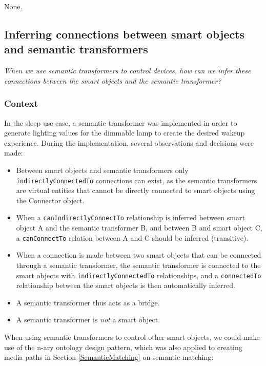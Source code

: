 None.



\subsection{Inferring connections between smart objects and semantic transformers }

\emph{When we use semantic transformers to control devices, how can we infer these connections between the smart objects and the semantic transformer?}
\subsubsection{Context}

In the sleep use-case, a semantic transformer was implemented in order to generate lighting values for the dimmable lamp to create the desired wakeup experience. During the implementation, several observations and decisions were made:

\begin{itemize}
\item 	Between smart objects and semantic transformers only \texttt{indirectly\-ConnectedTo} connections can exist, as the semantic transformers are virtual entities that cannot be directly connected to smart objects using the Connector object.
\item 	When a \texttt{canIndirectlyConnectTo} relationship is inferred between smart object A and the semantic transformer B, and between B and smart object C, a \texttt{canConnectTo} relation between A and C should be inferred (transitive).
\item 	When a connection is made between two smart objects that can be connected through a semantic transformer, the semantic transformer is connected to the smart objects with \texttt{indirectly\-ConnectedTo} relationships, and a \texttt{connectedTo} relationship between the smart objects is then automatically inferred.
\item 	A semantic transformer thus acts as a bridge.
\item 	A semantic transformer is \emph{not} a smart object. 
\end{itemize}


When using semantic transformers to control other smart objects, we could make use of the n-ary ontology design pattern, which was also applied to creating media paths in Section \ref{SemanticMatching} on semantic matching: %

